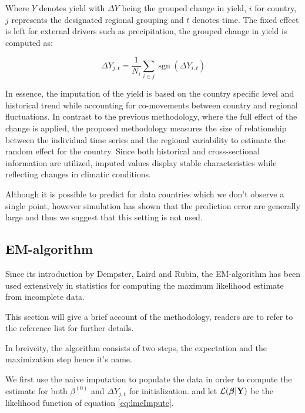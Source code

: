 \documentclass[nojss]{jss}\usepackage[]{graphicx}\usepackage[]{color}
\DeclareMathOperator{\sgn}{sgn}
\begin{document}
Where $Y$ denotes yield with $\Delta{Y}$ being the grouped change in
yield, $i$ for country, $j$ represents the designated regional
grouping and $t$ denotes time. The fixed effect is left for external
drivers such as precipitation, the grouped change in yield is computed
as:

\begin{equation}
  \label{eq:DeltaYield}
  \Delta{Y}_{j, t} = \frac{1}{N_i}\sum_{i \in j} \sgn(\Delta{Y}_{i, t})
\end{equation}


In essence, the imputation of the yield is based on the country
specific level and historical trend while accounting for co-movements
between country and regional fluctuations. In contrast to the previous
methodology, where the full effect of the change is applied, the
proposed methodology measures the size of relationship between the
individual time series and the regional variability to estimate the
random effect for the country. Since both historical and
cross-sectional information are utilized, imputed values display
stable characteristics while reflecting changes in climatic
conditions.

Although it is possible to predict for data countries which we don't
observe a single point, however simulation has shown that the
prediction error are generally large and thus we suggest that this
setting is not used.

\subsection{EM-algorithm}
Since its introduction by Dempster, Laird and Rubin, the EM-algorithm
has been used extensively in statistics for computing the maximum
likelihood estimate from incomplete data.

This section will give a brief account of the methodology, readers are
to refer to the reference list for further details.

In breiveity, the algorithm consists of two steps, the expectation and
the maximization step hence it's name.

We first use the naive imputation to populate the data in order to
compute the estimate for both $\beta^{(0)}$ and $\Delta Y_{j, t}$ for
initialization. and let $\cal{L}(\boldsymbol{\beta}|\mathbf{Y})$ be
the likelihood function of equation \ref{eq:lmeImpute}.
\end{document}
